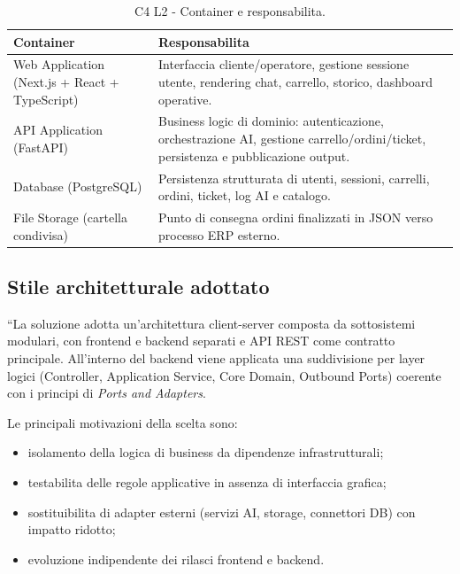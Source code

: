 \documentclass[a4paper, 11pt, oneside]{scrartcl}
\begin{document}
\begin{table}[H]
    \centering
    \renewcommand{\arraystretch}{1.2}
    \begin{tabularx}{\textwidth}{@{}lL@{}}
        \toprule
        \textbf{Container} & \textbf{Responsabilita} \\
        \midrule
        Web Application (Next.js + React + TypeScript) & Interfaccia cliente/operatore, gestione sessione utente, rendering chat, carrello, storico, dashboard operative. \\
        API Application (FastAPI) & Business logic di dominio: autenticazione, orchestrazione AI, gestione carrello/ordini/ticket, persistenza e pubblicazione output. \\
        Database (PostgreSQL) & Persistenza strutturata di utenti, sessioni, carrelli, ordini, ticket, log AI e catalogo. \\
        File Storage (cartella condivisa) & Punto di consegna ordini finalizzati in JSON verso processo ERP esterno. \\
        \bottomrule
    \end{tabularx}
    \caption{C4 L2 - Container e responsabilita.}
\end{table}

\subsection{Stile architetturale adottato}
“La soluzione adotta un'architettura client-server composta da sottosistemi modulari, con frontend e backend separati e API REST come contratto principale.
All'interno del backend viene applicata una suddivisione per layer logici (Controller, Application Service, Core Domain, Outbound Ports) coerente con i principi di \textit{Ports and Adapters}.

Le principali motivazioni della scelta sono:
\begin{itemize}
    \item isolamento della logica di business da dipendenze infrastrutturali;
    \item testabilita delle regole applicative in assenza di interfaccia grafica;
    \item sostituibilita di adapter esterni (servizi AI, storage, connettori DB) con impatto ridotto;
    \item evoluzione indipendente dei rilasci frontend e backend.
\end{itemize}

\newpage
\end{document}
